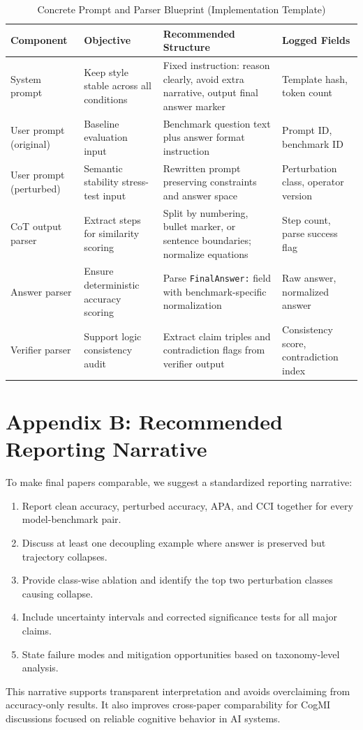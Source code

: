 \documentclass[conference]{IEEEtran}
\begin{document}
\begin{table}[!t]
\caption{Concrete Prompt and Parser Blueprint (Implementation Template)}
\label{tab:prompt-blueprint}
\centering
\begin{tabular}{p{1.6cm}p{4.2cm}p{6.1cm}p{2.6cm}}
\toprule
Component & Objective & Recommended Structure & Logged Fields \\
\midrule
System prompt & Keep style stable across all conditions & Fixed instruction: reason clearly, avoid extra narrative, output final answer marker & Template hash, token count \\
User prompt (original) & Baseline evaluation input & Benchmark question text plus answer format instruction & Prompt ID, benchmark ID \\
User prompt (perturbed) & Semantic stability stress-test input & Rewritten prompt preserving constraints and answer space & Perturbation class, operator version \\
CoT output parser & Extract steps for similarity scoring & Split by numbering, bullet marker, or sentence boundaries; normalize equations & Step count, parse success flag \\
Answer parser & Ensure deterministic accuracy scoring & Parse \texttt{FinalAnswer:} field with benchmark-specific normalization & Raw answer, normalized answer \\
Verifier parser & Support logic consistency audit & Extract claim triples and contradiction flags from verifier output & Consistency score, contradiction index \\
\bottomrule
\end{tabular}
\end{table}

\section*{Appendix B: Recommended Reporting Narrative}
To make final papers comparable, we suggest a standardized reporting narrative:
\begin{enumerate}[leftmargin=*]
\item Report clean accuracy, perturbed accuracy, APA, and CCI together for every model-benchmark pair.
\item Discuss at least one decoupling example where answer is preserved but trajectory collapses.
\item Provide class-wise ablation and identify the top two perturbation classes causing collapse.
\item Include uncertainty intervals and corrected significance tests for all major claims.
\item State failure modes and mitigation opportunities based on taxonomy-level analysis.
\end{enumerate}

This narrative supports transparent interpretation and avoids overclaiming from accuracy-only results. It also improves cross-paper comparability for CogMI discussions focused on reliable cognitive behavior in AI systems.



\end{document}
